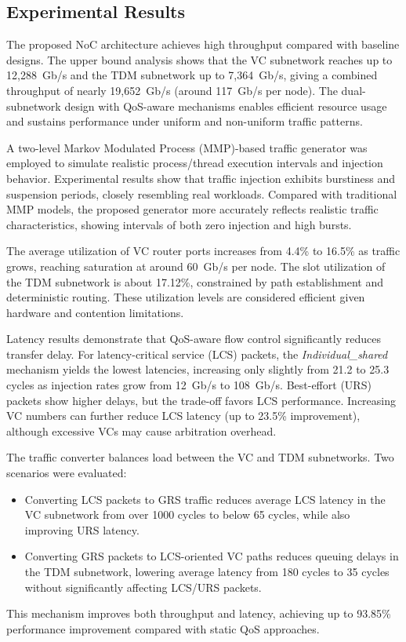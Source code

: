 \subsection{Experimental Results}

The proposed NoC architecture achieves high throughput compared with baseline designs. The upper bound analysis shows that the VC subnetwork reaches up to 12{,}288~Gb/s and the TDM subnetwork up to 7{,}364~Gb/s, giving a combined throughput of nearly 19{,}652~Gb/s (around 117~Gb/s per node). 
The dual-subnetwork design with QoS-aware mechanisms enables efficient resource usage and sustains performance under uniform and non-uniform traffic patterns.

A two-level Markov Modulated Process (MMP)-based traffic generator was employed to simulate realistic process/thread execution intervals and injection behavior. Experimental results show that traffic injection exhibits burstiness and suspension periods, closely resembling real workloads. Compared with traditional MMP models, the proposed generator more accurately reflects realistic traffic characteristics, showing intervals of both zero injection and high bursts.

The average utilization of VC router ports increases from 4.4\% to 16.5\% as traffic grows, reaching saturation at around 60~Gb/s per node. The slot utilization of the TDM subnetwork is about 17.12\%, constrained by path establishment and deterministic routing. These utilization levels are considered efficient given hardware and contention limitations.

Latency results demonstrate that QoS-aware flow control significantly reduces transfer delay. For latency-critical service (LCS) packets, the \textit{Individual\_shared} mechanism yields the lowest latencies, increasing only slightly from 21.2 to 25.3 cycles as injection rates grow from 12~Gb/s to 108~Gb/s. 
Best-effort (URS) packets show higher delays, but the trade-off favors LCS performance. Increasing VC numbers can further reduce LCS latency (up to 23.5\% improvement), although excessive VCs may cause arbitration overhead.

The traffic converter balances load between the VC and TDM subnetworks. 
Two scenarios were evaluated:
\begin{itemize}
    \item Converting LCS packets to GRS traffic reduces average LCS latency in the VC 
    subnetwork from over 1000 cycles to below 65 cycles, while also improving URS latency.
    \item Converting GRS packets to LCS-oriented VC paths reduces queuing delays in the 
    TDM subnetwork, lowering average latency from 180 cycles to 35 cycles without 
    significantly affecting LCS/URS packets.
\end{itemize}
This mechanism improves both throughput and latency, achieving up to 93.85\% performance improvement compared with static QoS approaches.


